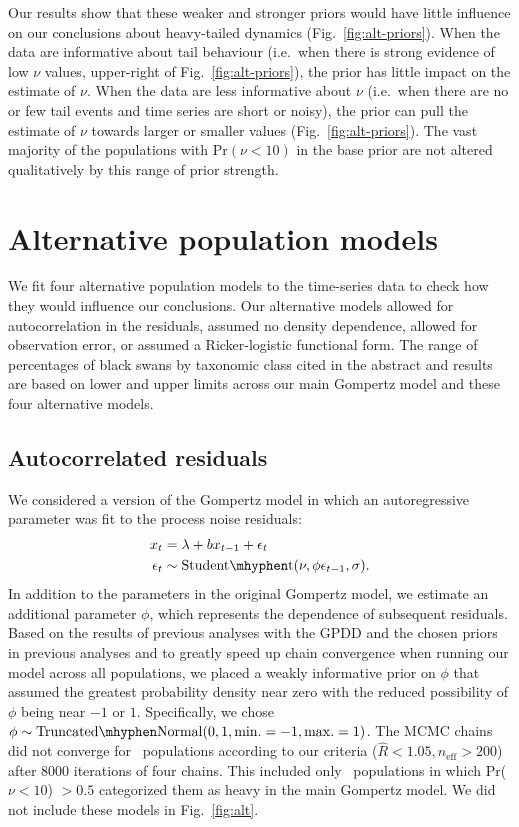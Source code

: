 Our results show that these weaker and stronger priors would have little influence on our conclusions about heavy-tailed dynamics (Fig.~\ref{fig:alt-priors}). When the data are informative about tail behaviour (i.e.\ when there is strong evidence of low $\nu$ values, upper-right of Fig.~\ref{fig:alt-priors}), the prior has little impact on the estimate of $\nu$. When the data are less informative about $\nu$ (i.e.\ when there are no or few tail events and time series are short or noisy), the prior can pull the estimate of $\nu$ towards larger or smaller values (Fig.~\ref{fig:alt-priors}). The vast majority of the populations with Pr$(\nu < 10)$ in the base prior are not altered qualitatively by this range of prior strength.

\section{Alternative population models}

We fit four alternative population models to the time-series data to check how they would influence our conclusions. Our alternative models allowed for autocorrelation in the residuals, assumed no density dependence, allowed for observation error, or assumed a Ricker-logistic functional form. The range of percentages of black swans by taxonomic class cited in the abstract and results are based on lower and upper limits across our main Gompertz model and these four alternative models.

\subsection{Autocorrelated residuals}

We considered a version of the Gompertz model in which an autoregressive
parameter was fit to the process noise residuals:
\begin{align*}
x_t &= \lambda + b x_{t-1} + \epsilon_t\\
\epsilon_t &\sim \mathrm{Student\mhyphen t}(\nu, \phi \epsilon_{t-1}, \sigma).
\end{align*}
In addition to the parameters in the original Gompertz model, we estimate an additional parameter $\phi$, which represents the dependence of subsequent residuals. Based on the results of previous analyses with the GPDD \citep[e.g.][]{connors2014} and the chosen priors in previous analyses \citep[e.g.][]{thorson2014a} and to greatly speed up chain convergence when running our model across all populations, we placed a weakly informative prior on $\phi$ that assumed the greatest probability density near zero with the reduced possibility of $\phi$ being near $-1$ or $1$. Specifically, we chose $\phi \sim \mathrm{Truncated\mhyphen Normal}(0, 1, \mathrm{min.} = -1, \mathrm{max.} = 1)$. The MCMC chains did not converge for \modelsNoConvergeAROne\ populations according to our criteria ($\widehat{R} < 1.05, n_\mathrm{eff} > 200$) after 8000 iterations of four chains. This included only \modelsNoConvergeAROneHeavyBase\ populations in which Pr($\nu < 10$) $> 0.5$ categorized them as heavy in the main Gompertz model. We did not include these models in Fig.~\ref{fig:alt}.

